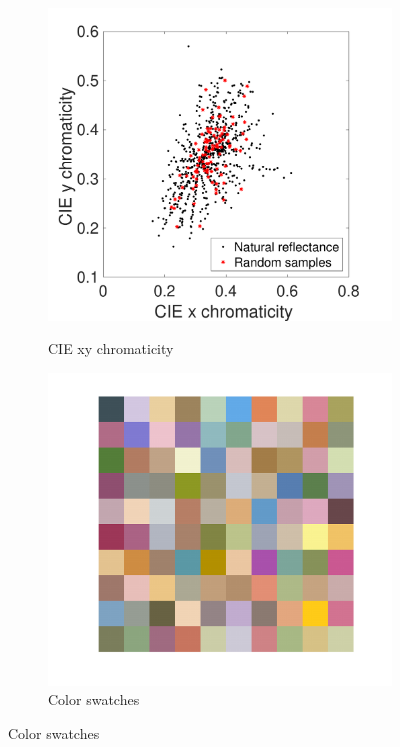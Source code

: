 \documentclass{jov}
\begin{document}
\begin{figure}
\begin{subfigure}{0.24 \textwidth}
        \label{fig:reflectanceSamples}
    \end{subfigure}
    \begin{subfigure}{0.24 \textwidth}
    \centering
    \caption{CIE xy chromaticity}
        \includegraphics[width=\textwidth]{../FiguresDraft5/Figure7/Figure7_c.pdf}
        \label{fig:xyChroReflectance}
    \end{subfigure}    
    \centering
	\begin{subfigure}{0.24 \textwidth}
    \centering
        \caption{Color swatches}
        \includegraphics[width=\textwidth]{../FiguresDraft5/Figure7/Figure7_d.pdf}

\end{subfigure}
\end{figure}
\end{document}
